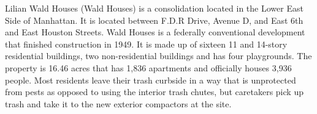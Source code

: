 Lilian Wald  Houses (Wald Houses) is a consolidation located in the Lower East Side of Manhattan. It is located between F.D.R Drive, Avenue D, and East 6th and East Houston Streets. Wald Houses is a federally conventional development that finished construction in 1949. It is made up of sixteen 11 and 14-story residential buildings, two non-residential buildings and has four playgrounds. The property is 16.46 acres that has 1,836 apartments and officially houses 3,936 people. Most residents leave their trash curbside in a way that is unprotected from pests as opposed to using the interior trash chutes, but caretakers pick up trash and take it to the new exterior compactors at the site.
